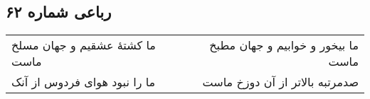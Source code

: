 \begin{center}
\section*{رباعی شماره ۶۲}
\label{sec:sh062}
\begin{longtable}{l p{0.5cm} r}
ما کشتهٔ عشقیم و جهان مسلخ ماست
&&
ما بیخور و خوابیم و جهان مطبخ ماست
\\
ما را نبود هوای فردوس از آنک
&&
صدمرتبه بالاتر از آن دوزخ ماست
\\
\end{longtable}
\end{center}
